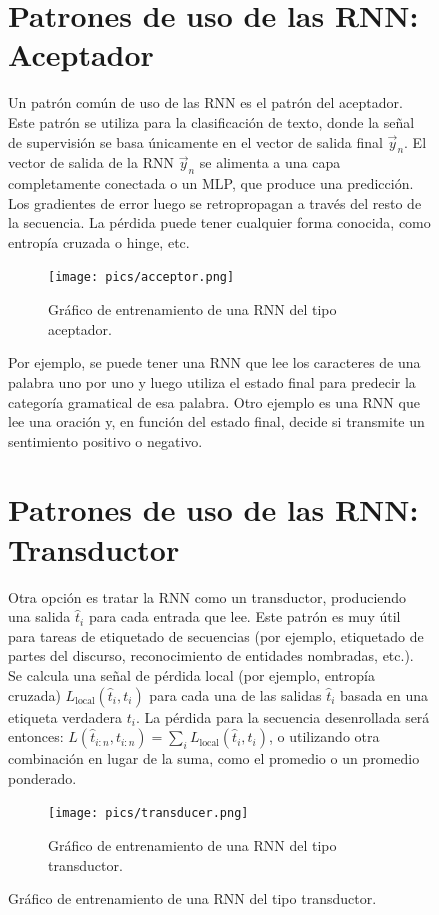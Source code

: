 \documentclass{book}
\begin{document}
\begin{figure}[h]
{\section{Patrones de uso de las RNN: Aceptador}

Un patrón común de uso de las RNN es el patrón del aceptador. Este patrón se utiliza para la clasificación de texto, donde la señal de supervisión se basa únicamente en el vector de salida final $\vec{y}_n$. El vector de salida de la RNN $\vec{y}_n$ se alimenta a una capa completamente conectada o un MLP, que produce una predicción. Los gradientes de error luego se retropropagan a través del resto de la secuencia. La pérdida puede tener cualquier forma conocida, como entropía cruzada o hinge, etc.

\begin{figure}[h]
  \centering
  \texttt{[image: pics/acceptor.png]}
  \caption{Gráfico de entrenamiento de una RNN del tipo aceptador.}
\end{figure}

Por ejemplo, se puede tener una RNN que lee los caracteres de una palabra uno por uno y luego utiliza el estado final para predecir la categoría gramatical de esa palabra. Otro ejemplo es una RNN que lee una oración y, en función del estado final, decide si transmite un sentimiento positivo o negativo.

\section{Patrones de uso de las RNN: Transductor}

Otra opción es tratar la RNN como un transductor, produciendo una salida $\hat{t}_i$ para cada entrada que lee. Este patrón es muy útil para tareas de etiquetado de secuencias (por ejemplo, etiquetado de partes del discurso, reconocimiento de entidades nombradas, etc.). Se calcula una señal de pérdida local (por ejemplo, entropía cruzada) $L_{\text

{local}}(\hat{t}_{i},{t}_{i})$ para cada una de las salidas $\hat{t}_{i}$ basada en una etiqueta verdadera ${t}_{i}$. La pérdida para la secuencia desenrollada será entonces: $L(\hat{t}_{i:n},{t}_{i:n}) = \sum_{i} L_{\text{{local}}}(\hat{t}_{i},{t}_{i})$, o utilizando otra combinación en lugar de la suma, como el promedio o un promedio ponderado.

\begin{figure}[h]
  \centering
  \texttt{[image: pics/transducer.png]}
  \caption{Gráfico de entrenamiento de una RNN del tipo transductor.}
\end{figure}

}
\end{figure}
\end{document}
